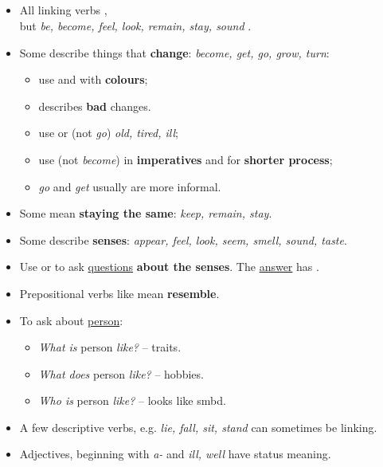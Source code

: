\subsection{}
\begin{itemize}
    \item[\doot] All linking verbs ,\\
    but \textit{be, become, feel, look, remain, stay, sound} .
    \item[\doot] Some describe things that \textbf{change}: \textit{become, get, go, grow, turn}:
    \begin{itemize}
        \item[\daash] use  and  with \textbf{colours};
        \item[\daash]  describes \textbf{bad} changes.
        \item[\daash] use  or  (not \textit{go})  \textit{old, tired, ill};
        \item[\daash] use  (not \textit{become}) in \textbf{imperatives} and for \textbf{shorter process};
        \item[\aast] \textit{go} and \textit{get} usually are more informal.
    \end{itemize}
    \item[\doot] Some mean \textbf{staying the same}: \textit{keep, remain, stay}.
    \item[\doot] Some describe \textbf{senses}: \textit{appear, feel, look, seem, smell, sound, taste}.
    \item Use  or 
    to ask \underline{questions} \textbf{about the senses}.
    The \underline{answer} has .
    \item[\doot] Prepositional verbs like  mean \textbf{resemble}.
    \item[\doot] To ask about \underline{person}:
    \begin{itemize}
        \item \textit{What is} person \textit{like?} -- traits.
        \item \textit{What does} person \textit{like?} -- hobbies.
        \item \textit{Who is} person \textit{like?} -- looks like smbd.
    \end{itemize}
    \item[\aast] A few descriptive verbs, e.g. \textit{lie, fall, sit, stand} can sometimes be linking.
    \item[\aast] Adjectives, beginning with \textit{a-} and \textit{ill, well} have status meaning.
\end{itemize}

